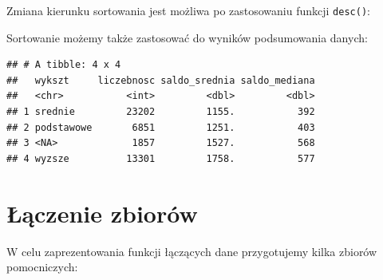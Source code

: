 \documentclass[]{book}
\newenvironment{Shaded}{\begin{snugshade}}{\end{snugshade}}
\newcommand{\KeywordTok}[1]{\textcolor[rgb]{0.13,0.29,0.53}{\textbf{#1}}}
\newcommand{\DataTypeTok}[1]{\textcolor[rgb]{0.13,0.29,0.53}{#1}}
\newcommand{\StringTok}[1]{\textcolor[rgb]{0.31,0.60,0.02}{#1}}
\newcommand{\OperatorTok}[1]{\textcolor[rgb]{0.81,0.36,0.00}{\textbf{#1}}}
\newcommand{\NormalTok}[1]{#1}
\begin{document}
\begin{Shaded}
\end{Shaded}

Zmiana kierunku sortowania jest możliwa po zastosowaniu funkcji
\texttt{desc()}:

\begin{Shaded}
\end{Shaded}

Sortowanie możemy także zastosować do wyników podsumowania danych:

\begin{Shaded}
\end{Shaded}

\begin{verbatim}
## # A tibble: 4 x 4
##   wykszt     liczebnosc saldo_srednia saldo_mediana
##   <chr>           <int>         <dbl>         <dbl>
## 1 srednie         23202         1155.           392
## 2 podstawowe       6851         1251.           403
## 3 <NA>             1857         1527.           568
## 4 wyzsze          13301         1758.           577
\end{verbatim}

\section{Łączenie zbiorów}\label{aczenie-zbiorow}

W celu zaprezentowania funkcji łączących dane przygotujemy kilka zbiorów
pomocniczych:
\end{document}
